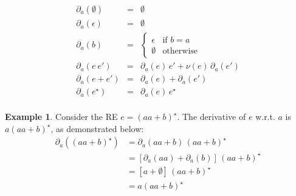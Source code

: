 \documentclass[fleqn,10pt]{SelfArx} %
\theoremstyle{definition}
\newtheorem{Example}{Example}
\begin{document}
\[
\begin{array}{lclr}
  \partial_a(\emptyset) & = & \emptyset\\
  \partial_a(\epsilon) & = & \emptyset \\
  \partial_a(b) & = & \left\{
                      \begin{array}{lr}
                        \epsilon & \text{if } b = a\\
                        \emptyset & \text{otherwise}
                      \end{array}
                                \right. \\
  \partial_a(e\:e') & = & \partial_a(e)\,e' + \nu(e)\,\partial_a(e')\\
  \partial_a(e + e') & = & \partial_a(e) + \partial_a(e') \\
  \partial_a(e^\star) & = & \partial_a(e)\,e^\star\\
\end{array}
\]

\begin{Example}
    Consider the RE $e = (aa + b)^\star$. The derivative of $e$ w.r.t. $a$ is $a(aa + b)^\star$, as demonstrated below:
    \begin{align*}
        \partial_a((aa + b)^\star) &= \partial_a(aa + b)\,(aa + b)^\star\\ 
                                   &= \left\lbrack \partial_a (aa) + \partial_a(b)\right\rbrack\,(aa + b)^\star\\
                                   &= \left\lbrack a + \emptyset \right\rbrack\, (aa + b)^\star \\
                                   &= a(aa + b)^\star
    \end{align*}
\end{Example}    
\end{document}

